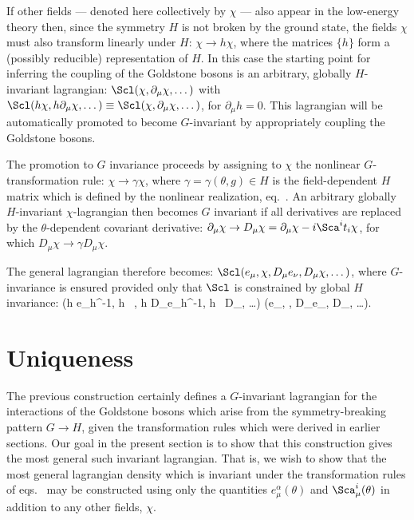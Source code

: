 \documentclass[12pt,epsf]{report}
\begin{document}
If other fields --- denoted here collectively by $\chi$ ---
also appear in the low-energy theory then, since the
symmetry $H$ is not broken by the ground state, the fields
$\chi$ must also transform linearly under $H$: $\chi \to h
\chi$, where the matrices $\{ h \}$ form a (possibly
reducible) representation of $H$. In this case the starting
point for inferring the coupling of the Goldstone bosons is
an arbitrary, globally $H$-invariant lagrangian: 
$\Scl(\chi, \partial_\mu \chi, \dots)$ with $ \Scl(h \chi,
h 
\partial_\mu \chi, \dots) \equiv \Scl(\chi, \partial_\mu
\chi, \dots)$, for $\partial_\mu h = 0$. This lagrangian
will be automatically promoted to become $G$-invariant by
appropriately coupling the Goldstone bosons.

The promotion to $G$ invariance proceeds by assigning to
$\chi$ the nonlinear $G$-transformation rule: $\chi \to
\gamma \chi$, where $\gamma = \gamma(\theta,g) \in H$ is
the field-dependent $H$ matrix which is defined by the
nonlinear realization, 
eq.~. An arbitrary globally
$H$-invariant 
$\chi$-lagrangian then becomes $G$ invariant if all
derivatives are replaced by the $\theta$-dependent
covariant derivative: 
$\partial_\mu \chi \to D_\mu \chi = \partial_\mu \chi - i
\Sca^i 
t_i \chi$, for which $D_\mu \chi \to \gamma D_\mu \chi$.

The general lagrangian therefore becomes: $\Scl(e_\mu,
\chi, 
D_\mu e_\nu, D_\mu \chi, \dots)$, where $G$-invariance is
ensured provided only that $\Scl$ is constrained by global
$H$ invariance:
%
\eq
\label{genlagrinvc}
\Scl(h e_\mu h^{-1}, h \, \chi, h D_\mu e_\nu h^{-1}, h \,
D_\mu \chi, \dots)
\equiv \Scl(e_\mu, \chi, D_\mu e_\nu, D_\mu \chi, \dots).
\eeq

\section{Uniqueness}

The previous construction certainly defines a $G$-invariant
lagrangian for the interactions of the Goldstone bosons
which arise from the symmetry-breaking pattern $G \to H$,
given the transformation rules which were derived in
earlier sections. Our goal in the present section is to
show that this construction gives the most general such
invariant lagrangian. That is, we wish to show that the
most general lagrangian density which is invariant under
the transformation rules of eqs.~ may
be constructed using only the quantities
$e^\alpha_\mu(\theta)$ and $\Sca^i_\mu(\theta)$ in addition
to any other fields, $\chi$.
\end{document}
